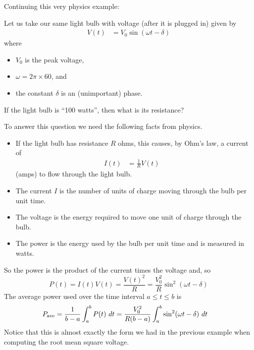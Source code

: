 Continuing this very physics example:
\begin{eg}\label{eg:AVpower}
Let us take our same light bulb with voltage (after it is plugged in) given by
\begin{align*}
 V(t) &= V_0\sin(\omega t-\delta)
\end{align*}
where
\begin{itemize}
\item $V_0$ is the peak voltage,
\item $\omega=2\pi\times 60$, and
\item the constant $\delta$ is an (unimportant) phase.
\end{itemize}
If the light bulb is ``100 watts'', then what is its resistance?

To answer this question we need the following facts from physics.
\begin{itemize}
\item
If the light bulb has resistance $R$ ohms, this causes, by Ohm's law, a current of
\begin{align*}
      I(t) &= \frac{1}{R} V(t) &
\end{align*}
(amps) to flow through the light bulb.
\item
The current $I$ is the number of units of charge moving through the bulb per unit time.
\item
The voltage is the energy required to move one unit of charge through the bulb.
\item
The power is the energy used by the bulb per unit time and is measured in watts.
\end{itemize}
So the power is the product of the current times the voltage and, so
\begin{equation*}
P(t)=I(t)V(t)
=\frac{V(t)^2}{R}
=\frac{V_0^2}{R}\sin^2(\omega t-\delta)
\end{equation*}
The average power used over the time interval $a\le t\le b$ is
\begin{align*}
P_{\mathrm{ave}} &= \frac{1}{b-a}\int_a^b P(t)\ dt
        = \frac{V_0^2}{R(b-a)}\int_a^b \sin^2(\omega t-\delta)\ dt
\end{align*}
Notice that this is almost exactly the form we had in the previous example when computing
the root mean square voltage.



\end{eg}
